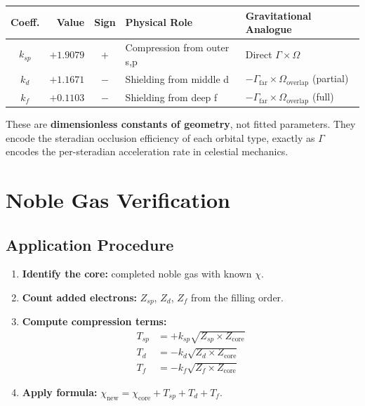\begin{center}
\begin{tabular}{crcll}
\hline
\textbf{Coeff.} & \textbf{Value} & \textbf{Sign} & \textbf{Physical Role} & \textbf{Gravitational Analogue} \\
\hline
$k_{sp}$ & $+1.9079$ & $+$ & Compression from outer s,p & Direct $\Gamma \times \Omega$ \\
$k_d$    & $+1.1671$ & $-$ & Shielding from middle d   & $-\Gamma_{\text{far}} \times \Omega_{\text{overlap}}$ (partial) \\
$k_f$    & $+0.1103$ & $-$ & Shielding from deep f     & $-\Gamma_{\text{far}} \times \Omega_{\text{overlap}}$ (full) \\
\hline
\end{tabular}
\end{center}

These are \textbf{dimensionless constants of geometry}, not fitted parameters.  They encode the steradian occlusion efficiency of each orbital type, exactly as $\Gamma$ encodes the per-steradian acceleration rate in celestial mechanics.


\section{Noble Gas Verification}

\subsection{Application Procedure}

\begin{enumerate}
  \item \textbf{Identify the core:} completed noble gas with known $\chi$.
  \item \textbf{Count added electrons:} $Z_{sp}$, $Z_d$, $Z_f$ from the filling order.
  \item \textbf{Compute compression terms:}
    \begin{align}
      T_{sp} &= +k_{sp}\sqrt{Z_{sp} \times Z_{\text{core}}} \\
      T_d    &= -k_d\sqrt{Z_d \times Z_{\text{core}}} \\
      T_f    &= -k_f\sqrt{Z_f \times Z_{\text{core}}}
    \end{align}
  \item \textbf{Apply formula:} $\chi_{\text{new}} = \chi_{\text{core}} + T_{sp} + T_d + T_f$.
\end{enumerate}


